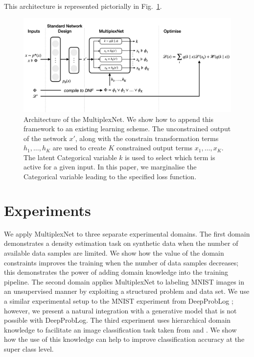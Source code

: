 \documentclass[letterpaper]{article} %
\begin{document}
This architecture is represented pictorially in Fig.~\ref{fig:pictorial_architecture}.

\begin{figure}
  \centering
  \includegraphics[width=\textwidth]{images/multiplexnet_architecture_overview.png}
  \caption{Architecture of the MultiplexNet. We show how to append this framework to an existing learning scheme. The unconstrained output of the network $x'$, along with the constrain transformation terms $h_1, \dots , h_K$ are used to create $K$ constrained output terms $x_1, \dots , x_K$. The latent Categorical variable $k$ is used to select which term is active for a given input. In this paper, we marginalise the Categorical variable leading to the specified loss function.}
  \label{fig:pictorial_architecture}
\end{figure}

\section{Experiments}
\label{sec:experiments}

We apply MultiplexNet to three separate experimental domains. 
The first domain demonstrates a density estimation task on synthetic data when the number of available data samples are limited.
We show how the value of the domain constraints improves the training when the number of data samples decreases; this demonstrates the power of adding domain knowledge into the training pipeline.
The second domain applies MultiplexNet to labeling MNIST images in an unsupervised manner by exploiting a structured problem and data set.
We use a similar experimental setup to the MNIST experiment from DeepProbLog \citep{manhaeve2018deepproblog}; however, we present a natural integration with a generative model that is not possible with DeepProbLog.
The third experiment uses hierarchical domain knowledge to facilitate an image classification task taken from \citet{fischer2018dl2} and \citet{xu2017semantic}.
We show how the use of this knowledge can help to improve classification accuracy at the super class level.
\end{document}
